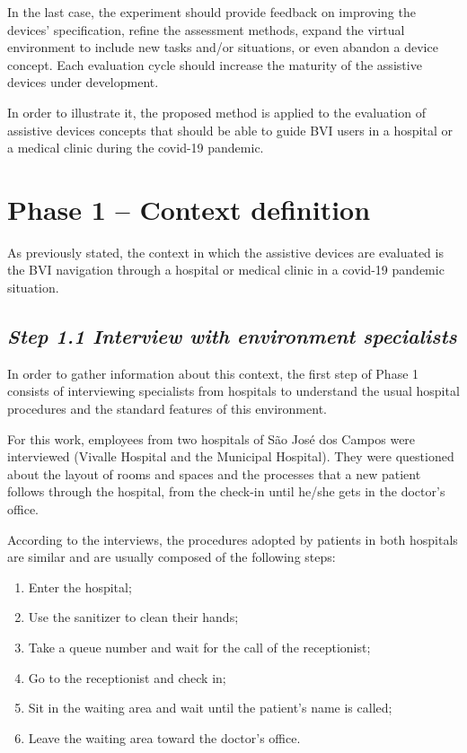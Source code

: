 In the last case, the experiment should provide feedback on improving the devices' specification, refine the assessment methods, expand the virtual environment to include new tasks and/or situations, or even abandon a device concept. Each evaluation cycle should increase the maturity of the assistive devices under development.

In order to illustrate it, the proposed method is applied to the evaluation of assistive devices concepts that should be able to guide BVI users in a hospital or a medical clinic during the covid-19 pandemic.

\section{Phase 1 – Context definition}
\label{sec:interviews_phase}
    As previously stated, the context in which the assistive devices are evaluated is the BVI navigation through a hospital or medical clinic in a covid-19 pandemic situation. 

    \subsection*{\textit{Step 1.1 Interview with environment specialists}}
    
        In order to gather information about this context, the first step of Phase 1 consists of interviewing specialists from hospitals to understand the usual hospital procedures and the standard features of this environment.
        
        For this work, employees from two hospitals of São José dos Campos were interviewed (Vivalle Hospital and the Municipal Hospital). They were questioned about the layout of rooms and spaces and the processes that a new patient follows through the hospital, from the check-in until he/she gets in the doctor's office. 

        According to the interviews, the procedures adopted by patients in both hospitals are similar and are usually composed of the following steps:

        \begin{enumerate}
            \item Enter the hospital;
            \item Use the sanitizer to clean their hands;
            \item Take a queue number and wait for the call of the receptionist;
            \item Go to the receptionist and check in;
            \item Sit in the waiting area and wait until the patient's name is called;
            \item Leave the waiting area toward the doctor's office.            
        \end{enumerate}


